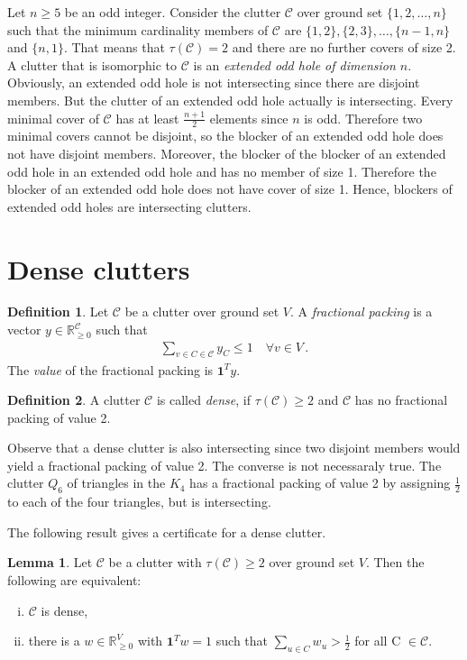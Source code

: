 \documentclass[a4paper, 12pt, twoside=false]{scrbook}
\theoremstyle{definition}
\newtheorem*{definition}{Definition}
\newtheorem{lemma}[theorem]{Lemma}
\newcommand*{\IR}{\ensuremath{\mathbb{R}}}
\begin{document}
Let $n\geq 5$ be an odd integer.
Consider the clutter $\mathcal{C}$ over ground set $\{1,2,\ldots,n\}$ such that the minimum cardinality members of $\mathcal{C}$ are $\{1,2\},\{2,3\},\ldots,\{n-1,n\}$ and $\{n,1\}$.
That means that $\tau(\mathcal{C})=2$ and there are no further covers of size 2.
A clutter that is isomorphic to $\mathcal{C}$ is an \emph{extended odd hole of dimension $n$}\cite{deltas}.
Obviously, an extended odd hole is not intersecting since there are disjoint members.
But the clutter of an extended odd hole actually is intersecting.
Every minimal cover of $\mathcal{C}$ has at least $\frac{n+1}2$ elements since $n$ is odd.
Therefore two minimal covers cannot be disjoint, so the blocker of an extended odd hole does not have disjoint members.
Moreover, the blocker of the blocker of an extended odd hole in an extended odd hole and has no member of size 1.
Therefore the blocker of an extended odd hole does not have cover of size 1.
Hence, blockers of extended odd holes are intersecting clutters.

\section{Dense clutters}
\begin{definition}
    Let $\mathcal{C}$ be a clutter over ground set $V$.
    A \emph{fractional packing} is a vector $y \in \IR_{\geq0}^{\mathcal{C}}$ such that
    \begin{align*}
        \sum_{v \in C \in \mathcal{C}} y_C \leq 1 \quad \forall v \in V \,.
    \end{align*}
    The \emph{value} of the fractional packing is $\textbf{1}^Ty$.
\end{definition}
\begin{definition}
    A clutter $\mathcal{C}$ is called \emph{dense}, if $\tau(\mathcal{C}) \geq 2$ and $\mathcal{C}$ has no fractional packing of value 2.
\end{definition}

Observe that a dense clutter is also intersecting since two disjoint members would yield a fractional packing of value 2.
The converse is not necessaraly true.
The clutter $Q_6$ of triangles in the $K_4$ has a fractional packing of value 2 by assigning $\frac 12$ to each of the four triangles, but is intersecting.

The following result gives a certificate for a dense clutter.
\begin{lemma}
    Let $\mathcal{C}$ be a clutter with $\tau(\mathcal{C})\geq 2$ over ground set $V$.
    Then the following are equivalent:
    \leavevmode
    \begin{enumerate}[(i)]
        \item $\mathcal{C}$ is dense,
        \item there is a $w \in \IR_{\geq 0}^V$ with $\textbf{1}^Tw=1$ such that $\sum_{u \in C} w_u > \frac 12$ for all C $\in \mathcal{C}$.
    \end{enumerate}
\end{lemma}
\end{document}
